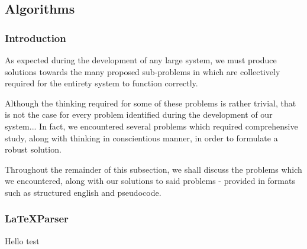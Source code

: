 \subsection*{Algorithms}
	\subsubsection*{Introduction}
		As expected during the development of any large system, we must produce solutions towards the many proposed sub-problems in which are collectively required for the entirety system to function correctly.
		
		Although the thinking required for some of these problems is rather trivial, that is not the case for every problem identified during the development of our system... In fact, we encountered several problems which required comprehensive study, along with thinking in conscientious manner, in order to formulate a robust solution.
		
		Throughout the remainder of this subsection, we shall discuss the problems which we encountered, along with our solutions to said problems - provided in formats such as structured english and pseudocode.
		
	\subsubsection*{\LaTeX Parser}
		Hello  test